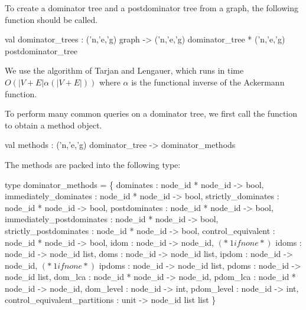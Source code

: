 To create a dominator tree and a postdominator tree
from a graph, the following function should be called.
\begin{SML}
 val dominator_trees : ('n,'e,'g) graph ->
         ('n,'e,'g) dominator_tree * ('n,'e,'g) postdominator_tree
\end{SML}
We use the algorithm of Tarjan and Lengauer, which
runs in time $O(|V+E|\alpha(|V+E|))$ where $\alpha$ is the functional
inverse of the Ackermann function.

To perform many common queries on a dominator tree, we first
call the function  to obtain a method object.
\begin{SML} 
  val methods : ('n,'e,'g) dominator_tree -> dominator_methods
\end{SML}

The methods are packed into the following type:
\begin{SML}
   type dominator_methods =
         \{ dominates              : node_id * node_id -> bool,
           immediately_dominates  : node_id * node_id -> bool,
           strictly_dominates     : node_id * node_id -> bool,
           postdominates          : node_id * node_id -> bool,
           immediately_postdominates : node_id * node_id -> bool,
           strictly_postdominates : node_id * node_id -> bool,
           control_equivalent     : node_id * node_id -> bool,
           idom         : node_id -> node_id, $(* ~1 if none *)$
           idoms        : node_id -> node_id list,
           doms         : node_id -> node_id list,
           ipdom        : node_id -> node_id, $(* ~1 if none *)$
           ipdoms       : node_id -> node_id list,
           pdoms        : node_id -> node_id list,
           dom_lca      : node_id * node_id -> node_id,
           pdom_lca     : node_id * node_id -> node_id,
           dom_level    : node_id -> int,
           pdom_level   : node_id -> int,
           control_equivalent_partitions : unit -> node_id list list
         \}
\end{SML}

